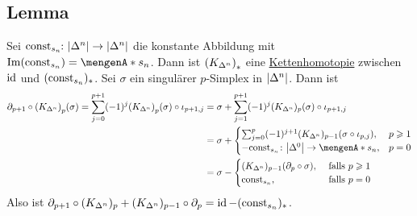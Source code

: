 \subsection[Lemma: Kettenhomotopie zwischen $\const_{s_n}$ und $\id$ auf $\abs*{\Delta^n}$]{Lemma} %
\label{sub:138}
Sei $\const_{s_n} \!\colon \abs*{\Delta^n} \to \abs*{\Delta^n}$ die konstante Abbildung mit $\im (\const_{s_n}) = \set{s_n} $. Dann ist $\enbrace*{K_{\Delta^n}}_*$ eine \hyperref[sub:76]{Kettenhomotopie} 
zwischen $\id$ und $(\const_{s_n})_*$.
Sei $\sigma$ ein singulärer $p$-Simplex in $\abs*{\Delta^n}$. Dann ist 
\begin{align*}
	\partial_{p+1} \circ \enbrace*{K_{\Delta^n}}_p (\sigma)  = \sum_{j=0}^{p+1} (-1)^{j} \enbrace*{K_{\Delta^n}}_p(\sigma) \circ \iota_{p+1,j} &= \sigma + 
	\sum_{j=1}^{p+1} (-1)^j (K_{\Delta^n})_p(\sigma) \circ \iota_{p+1,j} \\
	&= \sigma + \begin{cases}
		\sum_{j=0}^{p} (-1)^{j+1}  (K_{\Delta^n})_{p-1} \enbrace*{\sigma \circ \iota_{p,j}} , & p \ge 1\\
		- \const_{s_n} \colon \abs*{\Delta^0} \to \set{s_n} , & p=0  
	\end{cases} \\
	&= \sigma - \begin{cases}
		(K_{\Delta^n})_{p-1} (\partial_p \circ \sigma) , &\text{ falls }p \ge 1\\
		\const_{s_n}  , &\text{ falls } p=0  
	\end{cases}
\end{align*}
Also ist $\partial_{p+1} \circ (K_{\Delta^n})_p + (K_{\Delta^n})_{p-1} \circ \partial_p= \id - (\const_{s_n})_*$. \bewende

